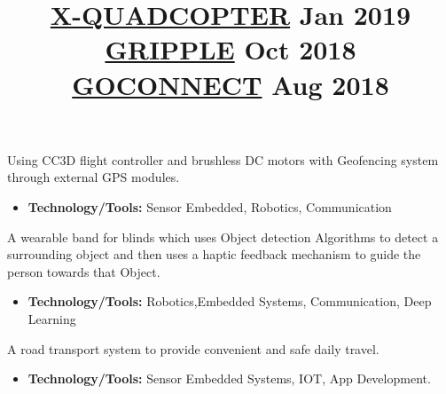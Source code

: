 \documentclass[margin]{res}
\begin{document}
\begin{resume}
\employer{}
\location{}
\title{\textbf{\underline{X-QUADCOPTER} \hfill Jan 2019}
 }
\begin{position}
Using CC3D flight controller and brushless DC motors with Geofencing system through external GPS modules.
\begin{itemize}
\item \textbf{Technology/Tools:} Sensor Embedded, Robotics, Communication
\end{itemize}
\end{position}

\employer{}
\location{}
\title{\textbf{\underline{GRIPPLE} \hfill Oct  2018}
 }
\begin{position}
A wearable band for blinds which uses Object detection Algorithms to detect a surrounding object and then uses a haptic feedback mechanism to guide the person towards that Object.
\begin{itemize}
\item \textbf{Technology/Tools:} Robotics,Embedded Systems, Communication, Deep Learning
\end{itemize}
\end{position}

\employer{}
\location{}
\title{\textbf{\underline{GOCONNECT} \hfill Aug  2018}
 }
\begin{position}
A road transport system to provide convenient and safe daily travel.
\begin{itemize}
\item \textbf{Technology/Tools:} Sensor Embedded Systems, IOT, App Development.
\end{itemize}
\end{position}



\end{resume}
\end{document}
